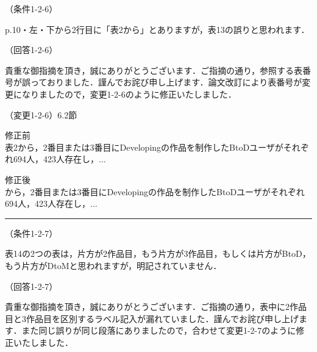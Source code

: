 \documentclass{jarticle} %
\def\subsection#1{ \vspace{1pc} {\gt #1} }
\def\nextans{ \vspace{2pc} \hrule }
\begin{document}
\subsection{（条件1-2-6）}

p.10・左・下から2行目に「表2から」とありますが，表13の誤りと思われます．

\subsection{（回答1-2-6）}

貴重な御指摘を頂き，誠にありがとうございます．ご指摘の通り，参照する表番号が誤っておりました．謹んでお詫び申し上げます．論文改訂により表番号が変更になりましたので，変更1-2-6のように修正いたしました．


\subsection{（変更1-2-6）6.2節}
\vspace{-0.3cm}
\begin{description}
\item 修正前\\
\phantom{　}
表2から，2番目または3番目にDevelopingの作品を制作したBtoDユーザがそれぞれ694人，423人存在し，...
\vspace{-0.3cm}
\item 修正後\\
\phantom{　}
\textcolor{red}{}から，2番目または3番目にDevelopingの作品を制作したBtoDユーザがそれぞれ694人，423人存在し，...
\end{description}




\newpage
\nextans
\subsection{（条件1-2-7）}

表14の2つの表は，片方が2作品目，もう片方が3作品目，もしくは片方がBtoD，もう片方がDtoMと思われますが，明記されていません．

\subsection{（回答1-2-7）}

貴重な御指摘を頂き，誠にありがとうございます．ご指摘の通り，表中に2作品目と3作品目を区別するラベル記入が漏れていました．謹んでお詫び申し上げます．また同じ誤りが同じ段落にありましたので，合わせて変更1-2-7のように修正いたしました．
\end{document}
